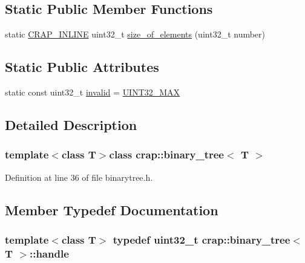\subsection*{Static Public Member Functions}
\begin{DoxyCompactItemize}
\item 
static \hyperlink{config__x86_8h_a5a40526b8d842e7ff731509998bb0f1c}{C\+R\+A\+P\+\_\+\+I\+N\+L\+I\+N\+E} uint32\+\_\+t \hyperlink{classcrap_1_1binary__tree_abbd91c82bb942a5b77cadf0f9c086efc}{size\+\_\+of\+\_\+elements} (uint32\+\_\+t number)
\end{DoxyCompactItemize}
\subsection*{Static Public Attributes}
\begin{DoxyCompactItemize}
\item 
static const uint32\+\_\+t \hyperlink{classcrap_1_1binary__tree_a87521e484b4d0bce9b166eeb635ec085}{invalid} = \hyperlink{crap__types_8h_ab5eb23180f7cc12b7d6c04a8ec067fdd}{U\+I\+N\+T32\+\_\+\+M\+A\+X}
\end{DoxyCompactItemize}


\subsection{Detailed Description}
\subsubsection*{template$<$class T$>$class crap\+::binary\+\_\+tree$<$ T $>$}



Definition at line 36 of file binarytree.\+h.



\subsection{Member Typedef Documentation}
\hypertarget{classcrap_1_1binary__tree_a750a57d699f2974e6a5415300a9696ff}{
\subsubsection[{handle}]{\setlength{\rightskip}{0pt plus 5cm}template$<$class T$>$ typedef uint32\+\_\+t {\bf crap\+::binary\+\_\+tree}$<$ T $>$\+::{\bf handle}}}\label{classcrap_1_1binary__tree_a750a57d699f2974e6a5415300a9696ff}


